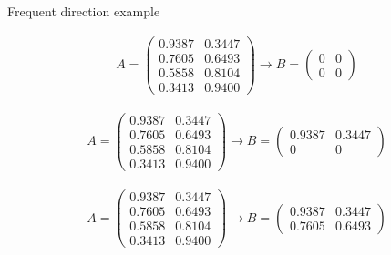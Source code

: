\documentclass[first=dgreen,second=purple,logo=redque]{aaltoslides}
\begin{document}
\begin{frame}[allowframebreaks=1]{Frequent direction example}

\begin{align}
  A = \begin{pmatrix}
       0.9387 & 0.3447 \\[0.3em] 
       0.7605 & 0.6493 \\[0.3em]
       0.5858 & 0.8104 \\[0.3em]
       0.3413 & 0.9400
     \end{pmatrix} 
  \rightarrow
  B = \begin{pmatrix}
      0  & 0  \\[0.3em] 
       0 & 0
     \end{pmatrix} \nonumber
\end{align}

\framebreak

\begin{align}
  A = \begin{pmatrix}
       0.9387 & 0.3447 \\[0.3em] 
       0.7605 & 0.6493 \\[0.3em]
       0.5858 & 0.8104 \\[0.3em]
       0.3413 & 0.9400
     \end{pmatrix} 
  \rightarrow
  B = \begin{pmatrix}
       0.9387 & 0.3447 \\[0.3em] 
       0 & 0
     \end{pmatrix} 
\end{align}

\framebreak

\begin{align}
  A = \begin{pmatrix}
       0.9387 & 0.3447 \\[0.3em] 
       0.7605 & 0.6493 \\[0.3em]
       0.5858 & 0.8104 \\[0.3em]
       0.3413 & 0.9400
     \end{pmatrix} 
  \rightarrow
  B = \begin{pmatrix}
       0.9387 & 0.3447 \\[0.3em] 
       0.7605 & 0.6493
     \end{pmatrix} 
\end{align}


\end{frame}
\end{document}
